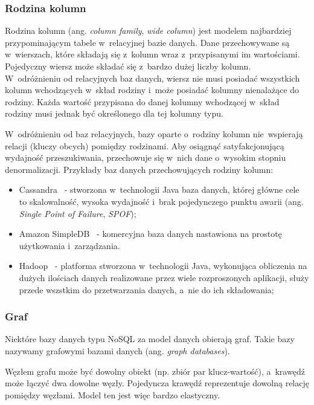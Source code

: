 \subsubsection{Rodzina kolumn} \label{sec:column_family}

Rodzina kolumn (ang. \emph{column family}, \emph{wide column}) jest modelem najbardziej przypominającym tabele w~relacyjnej bazie danych.
Dane przechowywane są w~wierszach, które składają się z~kolumn wraz z~przypisanymi im wartościami.
Pojedyczny wiersz może składać się z~bardzo dużej liczby kolumn.
W~odróżnieniu od relacyjnych baz danych, wiersz nie musi posiadać wszystkich kolumn wchodzących w~skład rodziny i~może posiadać kolumny nienalażące do rodziny.
Każda wartość przypisana do danej kolumny wchodzącej w~skład rodziny musi jednak być określonego dla tej kolumny typu.

W~odróżnieniu od baz relacyjnych, bazy oparte o~rodziny kolumn nie~wspierają relacji (kluczy obcych) pomiędzy rodzinami.
Aby osiągnąć satyfakcjonującą wydajność przeszukiwania, przechowuje się w~nich dane o~wysokim stopniu denormalizacji.
Przykłady baz danych przechowujących rodziny kolumn:

\begin{itemize}
 \item Cassandra~\cite{cassandra} - stworzona w~technologii Java baza danych, której główne cele to skalowalność, wysoka wydajność i~brak pojedynczego punktu awarii (ang. \emph{Single Point of Failure}, \emph{SPOF});
 \item Amazon SimpleDB~\cite{simple_db} - komercyjna baza danych nastawiona na prostotę użytkowania i~zarządzania.
 \item Hadoop~\cite{hadoop} - platforma stworzona w~technologii Java, wykonująca obliczenia na dużych ilościach danych realizowane przez wiele rozproszonych aplikacji, służy przede wszstkim do przetwarzania danych, a~nie do ich składowania;
\end{itemize}

\subsubsection{Graf}

Niektóre bazy danych typu NoSQL za model danych obierają graf.
Takie bazy nazywamy grafowymi bazami danych (ang. \emph{graph databases}).

Węzłem grafu może być dowolny obiekt (np. zbiór par klucz-wartość), a~krawędź może łączyć dwa dowolne węzły.
Pojedyncza krawędź reprezentuje dowolną relację pomiędzy węzłami.
Model ten jest więc bardzo elastyczny.

